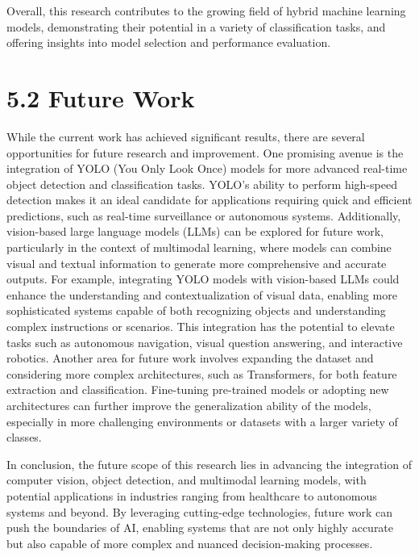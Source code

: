 \documentclass[12pt,a4paper]{report}
\begin{document}
Overall, this research contributes to the growing field of hybrid machine learning models, demonstrating their potential in a variety of classification tasks, and offering insights into model selection and performance evaluation.

\section*{5.2 Future Work}

\hspace{1cm}While the current work has achieved significant results, there are several opportunities for future research and improvement. One promising avenue is the integration of YOLO (You Only Look Once) models for more advanced real-time object detection and classification tasks. YOLO's ability to perform high-speed detection makes it an ideal candidate for applications requiring quick and efficient predictions, such as real-time surveillance or autonomous systems\cite{ref15}\cite{ref16}. Additionally, vision-based large language models (LLMs) can be explored for future work, particularly in the context of multimodal learning, where models can combine visual and textual information to generate more comprehensive and accurate outputs\cite{ref13}\cite{ref14}\cite{ref17}. For example, integrating YOLO models with vision-based LLMs could enhance the understanding and contextualization of visual data, enabling more sophisticated systems capable of both recognizing objects and understanding complex instructions or scenarios. This integration has the potential to elevate tasks such as autonomous navigation, visual question answering, and interactive robotics. Another area for future work involves expanding the dataset and considering more complex architectures, such as Transformers, for both feature extraction and classification. Fine-tuning pre-trained models or adopting new architectures can further improve the generalization ability of the models, especially in more challenging environments or datasets with a larger variety of classes.

In conclusion, the future scope of this research lies in advancing the integration of computer vision, object detection, and multimodal learning models, with potential applications in industries ranging from healthcare to autonomous systems and beyond. By leveraging cutting-edge technologies, future work can push the boundaries of AI, enabling systems that are not only highly accurate but also capable of more complex and nuanced decision-making processes.
\end{document}

